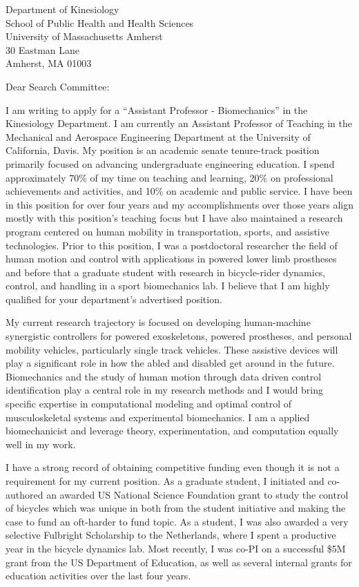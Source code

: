 \documentclass{letter}
\date{}
\begin{document}
\begin{letter}{
  Department of Kinesiology \\
  School of Public Health and Health Sciences \\
  University of Massachusetts Amherst \\
  30 Eastman Lane \\
  Amherst, MA 01003
}

\opening{Dear Search Committee:}

I am writing to apply for a ``Assistant Professor - Biomechanics'' in the
Kinesiology Department. I am currently an Assistant Professor of Teaching in
the Mechanical and Aerospace Engineering Department at the University of
California, Davis. My position is an academic senate tenure-track position
primarily focused on advancing undergraduate engineering education. I spend
approximately 70\% of my time on teaching and learning, 20\% on professional
achievements and activities, and 10\% on academic and public service. I have
been in this position for over four years and my accomplishments over those
years align mostly with this position's teaching focus but I have also
maintained a research program centered on human mobility in transportation,
sports, and assistive technologies. Prior to this position, I was a
postdoctoral researcher the field of human motion and control with applications
in powered lower limb prostheses and before that a graduate student with
research in bicycle-rider dynamics, control, and handling in a sport
biomechanics lab. I believe that I am highly qualified for your department's
advertised position.

My current research trajectory is focused on developing human-machine
synergistic controllers for powered exoskeletons, powered prostheses, and
personal mobility vehicles, particularly single track vehicles. These assistive
devices will play a significant role in how the abled and disabled get around
in the future. Biomechanics and the study of human motion through data driven
control identification play a central role in my research methods and I would
bring specific expertise in computational modeling and optimal control of
musculoskeletal systems and experimental biomechanics. I am a applied
biomechanicist and leverage theory, experimentation, and computation equally
well in my work.

I have a strong record of obtaining competitive funding even though it is not a
requirement for my current position. As a graduate student, I initiated and
co-authored an awarded US National Science Foundation grant to study the
control of bicycles which was unique in both from the student initiative and
making the case to fund an oft-harder to fund topic. As a student, I was also
awarded a very selective Fulbright Scholarship to the Netherlands, where I
spent a productive year in the bicycle dynamics lab. Most recently, I was co-PI
on a successful \$5M grant from the US Department of Education, as well as
several internal grants for education activities over the last four years.


\end{letter}
\end{document}
